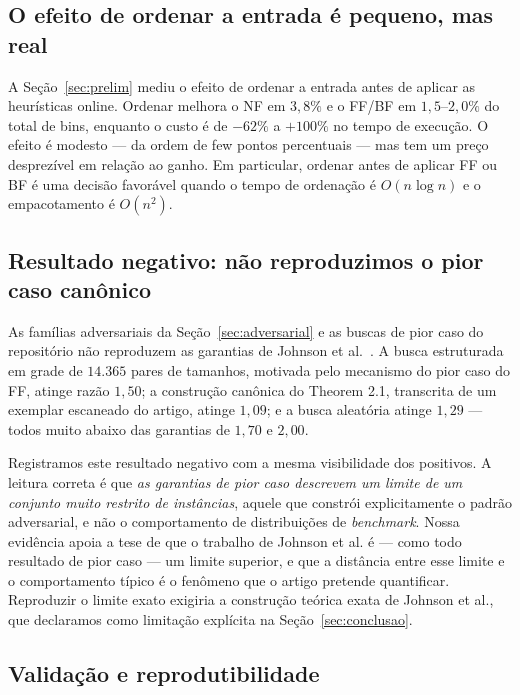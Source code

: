 \documentclass[12pt]{article}
\begin{document}
\subsection{O efeito de ordenar a entrada é pequeno, mas real}

A Seção~\ref{sec:prelim} mediu o efeito de ordenar a entrada antes de aplicar as heurísticas online. Ordenar melhora o NF em $3{,}8\%$ e o FF/BF em $1{,}5$--$2{,}0\%$ do total de bins, enquanto o custo é de $-62\%$ a $+100\%$ no tempo de execução. O efeito é modesto --- da ordem de few pontos percentuais --- mas tem um preço desprezível em relação ao ganho. Em particular, ordenar antes de aplicar FF ou BF é uma decisão favorável quando o tempo de ordenação é $O(n \log n)$ e o empacotamento é $O(n^2)$.

\subsection{Resultado negativo: não reproduzimos o pior caso canônico}

As famílias adversariais da Seção~\ref{sec:adversarial} e as buscas de pior caso do repositório não reproduzem as garantias de Johnson et al.~\cite{johnson1974}. A busca estruturada em grade de $14.365$ pares de tamanhos, motivada pelo mecanismo do pior caso do FF, atinge razão $1{,}50$; a construção canônica do Theorem 2.1, transcrita de um exemplar escaneado do artigo, atinge $1{,}09$; e a busca aleatória atinge $1{,}29$ --- todos muito abaixo das garantias de $1{,}70$ e $2{,}00$.

Registramos este resultado negativo com a mesma visibilidade dos positivos. A leitura correta é que \emph{as garantias de pior caso descrevem um limite de um conjunto muito restrito de instâncias}, aquele que constrói explicitamente o padrão adversarial, e não o comportamento de distribuições de \emph{benchmark}. Nossa evidência apoia a tese de que o trabalho de Johnson et al. é --- como todo resultado de pior caso --- um limite superior, e que a distância entre esse limite e o comportamento típico é o fenômeno que o artigo pretende quantificar. Reproduzir o limite exato exigiria a construção teórica exata de Johnson et al., que declaramos como limitação explícita na Seção~\ref{sec:conclusao}.

\subsection{Validação e reprodutibilidade}
\end{document}
